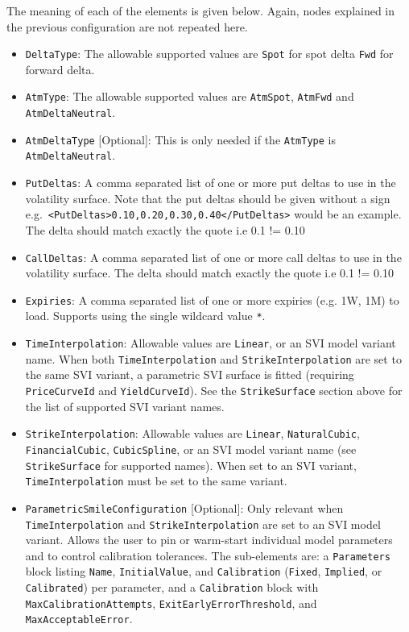 The meaning of each of the elements is given below. Again, nodes explained in the previous configuration are not repeated here.
\begin{itemize}
\item \lstinline!DeltaType!:
The allowable supported values are \lstinline!Spot! for spot delta \lstinline!Fwd! for forward delta.

\item \lstinline!AtmType!:
The allowable supported values are \lstinline!AtmSpot!, \lstinline!AtmFwd! and \lstinline!AtmDeltaNeutral!.

\item \lstinline!AtmDeltaType! [Optional]:
This is only needed if the \lstinline!AtmType! is \lstinline!AtmDeltaNeutral!.

\item \lstinline!PutDeltas!:
A comma separated list of one or more put deltas to use in the volatility surface. Note that the put deltas should be given without a sign e.g.\ \lstinline!<PutDeltas>0.10,0.20,0.30,0.40</PutDeltas>! would be an example. The delta should match exactly the quote i.e 0.1 != 0.10

\item \lstinline!CallDeltas!:
A comma separated list of one or more call deltas to use in the volatility surface. The delta should match exactly the quote i.e 0.1 != 0.10

\item \lstinline!Expiries!:
A comma separated list of one or more expiries (e.g. 1W, 1M) to load. Supports using the single wildcard value \lstinline!*!.

\item \lstinline!TimeInterpolation!:
Allowable values are \lstinline!Linear!, or an SVI model variant name. When both \lstinline!TimeInterpolation! and \lstinline!StrikeInterpolation! are set to the same SVI variant, a parametric SVI surface is fitted (requiring \lstinline!PriceCurveId! and \lstinline!YieldCurveId!). See the \lstinline!StrikeSurface! section above for the list of supported SVI variant names.

\item \lstinline!StrikeInterpolation!:
Allowable values are \lstinline!Linear!, \lstinline!NaturalCubic!, \lstinline!FinancialCubic!, \lstinline!CubicSpline!, or an SVI model variant name (see \lstinline!StrikeSurface! for supported names). When set to an SVI variant, \lstinline!TimeInterpolation! must be set to the same variant.

\item \lstinline!ParametricSmileConfiguration! [Optional]:
Only relevant when \lstinline!TimeInterpolation! and \lstinline!StrikeInterpolation! are set to an SVI model variant. Allows the user to pin or warm-start individual model parameters and to control calibration tolerances. The sub-elements are: a \lstinline!Parameters! block listing \lstinline!Name!, \lstinline!InitialValue!, and \lstinline!Calibration! (\lstinline!Fixed!, \lstinline!Implied!, or \lstinline!Calibrated!) per parameter, and a \lstinline!Calibration! block with \lstinline!MaxCalibrationAttempts!, \lstinline!ExitEarlyErrorThreshold!, and \lstinline!MaxAcceptableError!.


\end{itemize}
